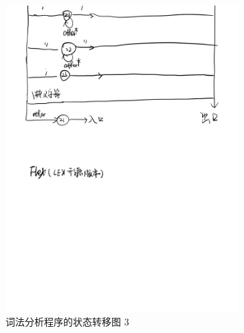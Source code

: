 \begin{figure}
  \begin{center}
    \includegraphics[width=0.8\textwidth]{figures/Page3.jpg}
  \end{center}
  \caption{词法分析程序的状态转移图 3}
  \label{fig:StateFig3}
\end{figure}
